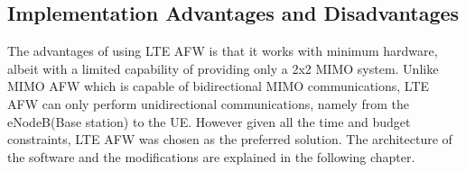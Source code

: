         \subsection{Implementation Advantages and Disadvantages}\label{ssec:LTEAFWADVDISADV}
        The advantages of using LTE AFW is that it works with minimum hardware, albeit with a limited capability of providing only a 2x2 MIMO system. Unlike MIMO AFW which is capable of bidirectional MIMO communications, LTE AFW can only perform unidirectional communications, namely from the eNodeB(Base station) to the UE. However given all the time and budget constraints, LTE AFW was chosen as the preferred solution. The architecture of the software and the modifications are explained in the following chapter.


